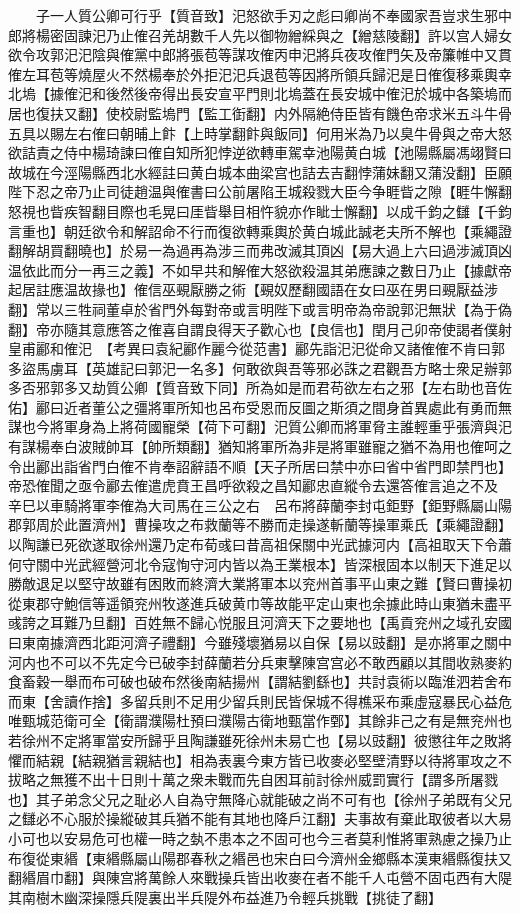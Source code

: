 　　子一人質公卿可行乎【質音致】汜怒欲手刃之彪曰卿尚不奉國家吾豈求生邪中郎將楊密固諫汜乃止傕召羌胡數千人先以御物繒綵與之【繒慈陵翻】許以宫人婦女欲令攻郭汜汜陰與傕黨中郎將張苞等謀攻傕丙申汜將兵夜攻傕門矢及帝簾帷中又貫傕左耳苞等燒屋火不然楊奉於外拒汜汜兵退苞等因將所領兵歸汜是日傕復移乘輿幸北塢【據傕汜和後然後帝得出長安宣平門則北塢蓋在長安城中傕汜於城中各築塢而居也復扶又翻】使校尉監塢門【監工衘翻】内外隔絶侍臣皆有饑色帝求米五斗牛骨五具以賜左右傕曰朝晡上飰【上時掌翻飰與飯同】何用米為乃以臭牛骨與之帝大怒欲詰責之侍中楊琦諫曰傕自知所犯悖逆欲轉車駕幸池陽黄白城【池陽縣屬馮翊賢曰故城在今涇陽縣西北水經註曰黄白城本曲梁宫也詰去吉翻悖蒲妹翻又蒲没翻】臣願陛下忍之帝乃止司徒趙温與傕書曰公前屠陷王城殺戮大臣今争睚眥之隙【睚牛懈翻怒視也眥疾智翻目際也毛晃曰厓眥舉目相忤貌亦作眦士懈翻】以成千鈞之讎【千鈞言重也】朝廷欲令和解詔命不行而復欲轉乘輿於黄白城此誠老夫所不解也【乘繩證翻解胡買翻曉也】於易一為過再為涉三而弗改滅其頂凶【易大過上六曰過涉滅頂凶温依此而分一再三之義】不如早共和解傕大怒欲殺温其弟應諫之數日乃止【據獻帝起居註應温故掾也】傕信巫覡厭勝之術【覡奴歷翻國語在女曰巫在男曰覡厭益涉翻】常以三牲祠董卓於省門外每對帝或言明陛下或言明帝為帝說郭汜無狀【為于偽翻】帝亦隨其意應答之傕喜自謂良得天子歡心也【良信也】閏月己卯帝使謁者僕射皇甫酈和傕汜　【考異曰袁紀酈作麗今從范書】酈先詣汜汜從命又諸傕傕不肯曰郭多盜馬虜耳【英雄記曰郭汜一名多】何敢欲與吾等邪必誅之君觀吾方略士衆足辦郭多否邪郭多又劫質公卿【質音致下同】所為如是而君苟欲左右之邪【左右助也音佐佑】酈曰近者董公之彊將軍所知也呂布受恩而反圖之斯須之間身首異處此有勇而無謀也今將軍身為上將荷國寵榮【荷下可翻】汜質公卿而將軍脅主誰輕重乎張濟與汜有謀楊奉白波賊帥耳【帥所類翻】猶知將軍所為非是將軍雖寵之猶不為用也傕呵之令出酈出詣省門白傕不肯奉詔辭語不順【天子所居曰禁中亦曰省中省門即禁門也】帝恐傕聞之亟令酈去傕遣虎賁王昌呼欲殺之昌知酈忠直縱令去還答傕言追之不及　辛巳以車騎將軍李傕為大司馬在三公之右　呂布將薛蘭李封屯鉅野【鉅野縣屬山陽郡郭周於此置濟州】曹操攻之布救蘭等不勝而走操遂斬蘭等操軍乘氏【乘繩證翻】以陶謙已死欲遂取徐州還乃定布荀彧曰昔高祖保關中光武據河内【高祖取天下令蕭何守關中光武經營河北令寇恂守河内皆以為王業根本】皆深根固本以制天下進足以勝敵退足以堅守故雖有困敗而終濟大業將軍本以兖州首事平山東之難【賢曰曹操初從東郡守鮑信等遥領兖州牧遂進兵破黄巾等故能平定山東也余據此時山東猶未盡平彧誇之耳難乃旦翻】百姓無不歸心悦服且河濟天下之要地也【禹貢兖州之域孔安國曰東南據濟西北距河濟子禮翻】今雖殘壞猶易以自保【易以豉翻】是亦將軍之關中河内也不可以不先定今已破李封薛蘭若分兵東擊陳宫宫必不敢西顧以其間收熟麥約食畜穀一舉而布可破也破布然後南結揚州【謂結劉繇也】共討袁術以臨淮泗若舍布而東【舍讀作捨】多留兵則不足用少留兵則民皆保城不得樵采布乘虛寇暴民心益危唯甄城范衛可全【衛謂濮陽杜預曰濮陽古衛地甄當作鄄】其餘非己之有是無兖州也若徐州不定將軍當安所歸乎且陶謙雖死徐州未易亡也【易以豉翻】彼懲往年之敗將懼而結親【結親猶言親結也】相為表裏今東方皆已收麥必堅壁清野以待將軍攻之不拔略之無獲不出十日則十萬之衆未戰而先自困耳前討徐州威罰實行【謂多所屠戮也】其子弟念父兄之耻必人自為守無降心就能破之尚不可有也【徐州子弟既有父兄之讎必不心服於操縱破其兵猶不能有其地也降戶江翻】夫事故有棄此取彼者以大易小可也以安易危可也權一時之埶不患本之不固可也今三者莫利惟將軍熟慮之操乃止布復從東緡【東緡縣屬山陽郡春秋之緡邑也宋白曰今濟州金鄉縣本漢東緡縣復扶又翻緡眉巾翻】與陳宫將萬餘人來戰操兵皆出收麥在者不能千人屯營不固屯西有大隄其南樹木幽深操隱兵隄裏出半兵隄外布益進乃令輕兵挑戰【挑徒了翻】